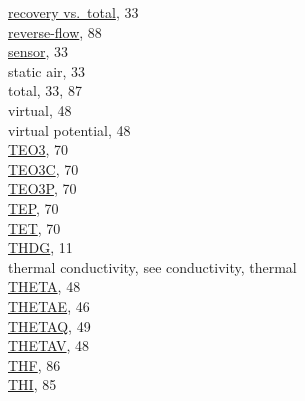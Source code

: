 \documentclass[
]{book}
\begin{document}
\hspace*{0.333em}\hspace*{0.333em}\href{./4-the-state-of-the-atmosphere.html\#recovery-t}{recovery vs.~total}, 33\\
\hspace*{0.333em}\hspace*{0.333em}\href{./10-obsolete-variables.html\#ttrf}{reverse-flow}, 88\\
\hspace*{0.333em}\hspace*{0.333em}\href{./4-the-state-of-the-atmosphere.html\#recovery-t}{sensor}, 33\\
\hspace*{0.333em}\hspace*{0.333em}static air, 33\\
\hspace*{0.333em}\hspace*{0.333em}total, 33, 87\\
\hspace*{0.333em}\hspace*{0.333em}virtual, 48\\
\hspace*{0.333em}\hspace*{0.333em}virtual potential, 48\\
\href{./6-air-chemistry-measurements.html\#te03}{TEO3}, 70\\
\href{./6-air-chemistry-measurements.html\#te03c}{TEO3C}, 70\\
\href{./6-air-chemistry-measurements.html\#tep}{TEO3P}, 70\\
\href{./6-air-chemistry-measurements.html\#tep}{TEP}, 70\\
\href{./6-air-chemistry-measurements.html\#tet}{TET}, 70\\
\href{./3-the-state-of-the-aircraft.html\#thdg}{THDG}, 11\\
thermal conductivity, see conductivity, thermal\\
\href{./4-the-state-of-the-atmosphere.html\#theta}{THETA}, 48\\
\href{./4-the-state-of-the-atmosphere.html\#thetae}{THETAE}, 46\\
\href{./4-the-state-of-the-atmosphere.html\#thetaq}{THETAQ}, 49\\
\href{./4-the-state-of-the-atmosphere.html\#thetav}{THETAV}, 48\\
\href{./10-obsolete-variables.html\#thf}{THF}, 86\\
\href{./10-obsolete-variables.html\#ltn51}{THI}, 85\\
\end{document}
